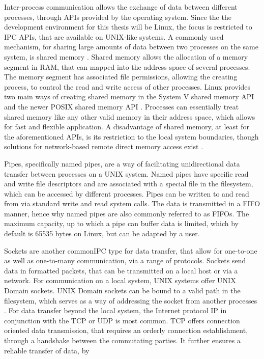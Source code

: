 Inter-process communication allows the exchange of data between different processes, through \acp{API} provided by the operating system. Since the
the development environment for this thesis will be Linux, the focus is restricted to \ac{IPC} APIs, that are available on UNIX-like systems.
A commonly used mechanism, for sharing large amounts of data between two processes on the same system, is shared memory \cite[p.301ff.]{stevens1998ipc}.
Shared memory allows the allocation of a memory segment in \ac{RAM}, that can mapped into the address space of several processes. The memory segment has associated file permissions, 
allowing the creating process, to control the read and write access of other processes. Linux provides two main ways of creating
shared memory in the System V shared memory \ac{API} and the newer POSIX shared memory \ac{API} \cite{posixshm,systemvshm}. Processes can essentially treat shared memory like 
any other valid memory in their address space, which allows for fast and flexible application. A disadvantage of shared memory, at least for the aforementioned APIs, is its restriction 
to the local system boundaries, though solutions for network-based remote direct memory access exist \cite{recio2007}.
\par 
{}
Pipes, specifically named pipes, are a way of facilitating unidirectional data transfer between processes on a UNIX system. Named pipes have specific read and write file descriptors and are  
associated with a special file in the filesystem, which can be accessed by different processes. Pipes can be written to and read from via standard write and read system calls. The data is transmitted in 
a \ac{FIFO} manner, hence why named pipes are also commonly referred to as FIFOs. The maximum capacity, up to which a pipe can buffer data is limited, which by default is 65535 bytes on Linux, but can be adapted by a user. \cite{pipe}   
\par
{}
Sockets are another common\ac{IPC} type for data transfer, that allow for one-to-one as well as one-to-many 
communication, via a range of protocols\cite[p.57ff.]{stevens1998sock}. Sockets send data in formatted packets, that can be transmitted on a local host or via a network. For communication on a local system, UNIX systems offer UNIX Domain sockets. UNIX Domain sockets can be bound to a valid path in the filesystem, which serves as a way of addressing
the socket from another processes \cite{unixsock}. For data transfer beyond the local system, the Internet protocol \ac{IP} in conjunction with the \ac{TCP} or \ac{UDP} is most common. TCP offers connection oriented data transmission, that requires an orderly connection establishment, through a handshake between the commutating parties. It further ensures a reliable transfer of data, by       
